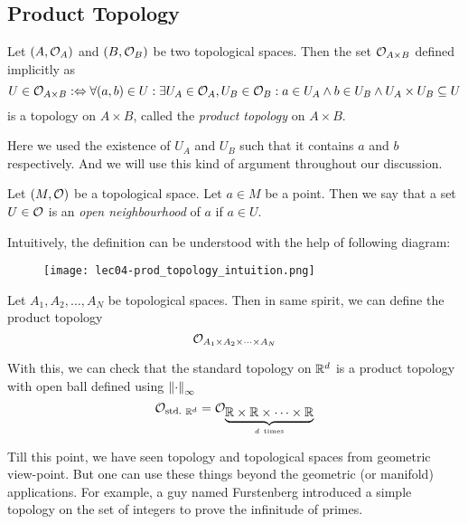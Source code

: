 \subsection{Product Topology}

\begin{definition}
	Let \((A, \mathcal{O}_A)\) and \((B, \mathcal{O}_B)\) be two topological spaces. Then the set \(\mathcal{O}_{A \times B}\) defined implicitly as
	\begin{equation}
		U \in \mathcal{O}_{A \times B} :\Leftrightarrow \forall (a, b) \in U: \exists U_A \in \mathcal{O}_A, U_B \in \mathcal{O}_B: a \in U_A \land b \in U_B \land U_A \times U_B \subseteq U \label{eq:product_topology}
	\end{equation}
	is a topology on \(A \times B\), called the \emph{product topology} on \(A \times B\).
\end{definition}
Here we used the existence of \(U_A\) and \(U_B\) such that it contains \(a\) and \(b\) respectively. And we will use this kind of argument throughout our discussion.

\noindent Let \((M, \mathcal{O})\) be a topological space. Let \(a \in M\) be a point. Then we say that a set \(U \in \mathcal{O}\) is an \emph{open neighbourhood} of \(a\) if \(a \in U\).

Intuitively, the definition can be understood with the help of following diagram:
\begin{figure}[H]
	\centering
	\texttt{[image: lec04-prod\_topology\_intuition.png]}
	\label{fig:prod_topology_intuition}
\end{figure}

\begin{remark}
	Let \(A_1, A_2, \ldots, A_N\) be topological spaces. Then in same spirit, we can define the product topology
	\begin{equation*}
		\mathcal{O}_{A_1 \times A_2 \times \cdots \times A_N}
	\end{equation*}
\end{remark}
With this, we can check that the standard topology on \(\mathbb R^d\) is a product topology with open ball defined using \(\norm{\cdot}_{\infty}\)
\begin{equation*}
	\mathcal{O}_{\text{std.}} {\;}_{\mathbb R^d} = \mathcal{O}_{\underbrace{\mathbb R \times \mathbb R \times \cdots \times \mathbb R}_{d\ \text{times}}}
\end{equation*}

Till this point, we have seen topology and topological spaces from geometric view-point. But one can use these things beyond the geometric (or manifold) applications. For example, a guy named Furstenberg introduced a simple topology on the set of integers to prove the infinitude of primes.

